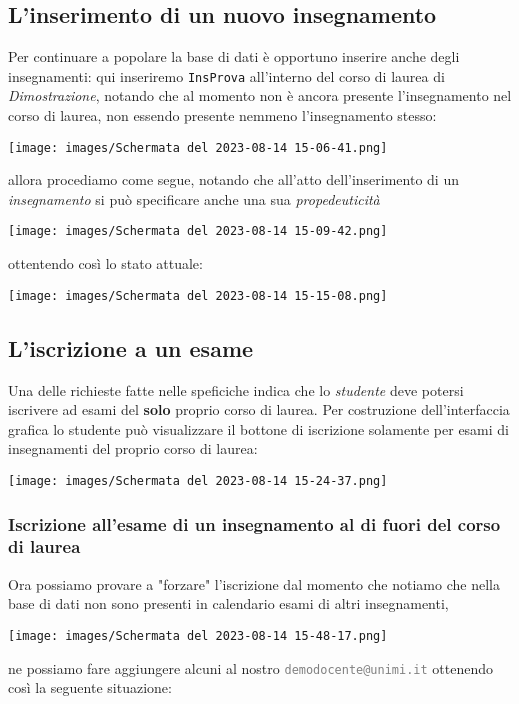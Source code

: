 \documentclass{article}
\newcommand{\attr}[1]{\texttt{\textcolor{gray}{#1}}}
\newcommand{\und}[0]{\textunderscore}
\begin{document}
\subsection{L'inserimento di un nuovo insegnamento}
Per continuare a popolare la base di dati è opportuno inserire anche degli insegnamenti: qui inseriremo \texttt{InsProva} all'interno del corso di laurea di \textit{Dimostrazione}, notando che al momento non è ancora presente l'insegnamento nel corso di laurea, non essendo presente nemmeno l'insegnamento stesso:

\texttt{[image: images/Schermata del 2023-08-14 15-06-41.png]}

allora procediamo come segue, notando che all'atto dell'inserimento di un \textit{insegnamento} si può specificare anche una sua \textit{propedeuticità}

\texttt{[image: images/Schermata del 2023-08-14 15-09-42.png]}

ottentendo così lo stato attuale:

\texttt{[image: images/Schermata del 2023-08-14 15-15-08.png]}

\subsection{L'iscrizione a un esame}
Una delle richieste fatte nelle speficiche indica che lo \textit{studente} deve potersi iscrivere ad esami del \textbf{solo} proprio corso di laurea. Per costruzione dell'interfaccia grafica lo studente può visualizzare il bottone di iscrizione solamente per esami di insegnamenti del proprio corso di laurea:

\texttt{[image: images/Schermata del 2023-08-14 15-24-37.png]}

\subsubsection{Iscrizione all'esame di un insegnamento al di fuori del corso di laurea}

Ora possiamo provare a "forzare" l'iscrizione dal momento che notiamo che nella base di dati non sono presenti in calendario esami di altri insegnamenti,

\texttt{[image: images/Schermata del 2023-08-14 15-48-17.png]}

ne possiamo fare aggiungere alcuni al nostro \attr{demo\und docente@unimi.it} ottenendo così la seguente situazione:
\end{document}
